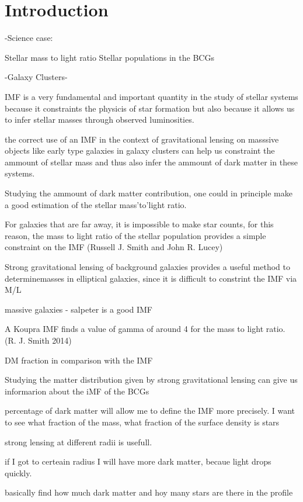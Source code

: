 \chapter{Introduction}

-Science case:

Stellar mass to light ratio
Stellar populations in the BCGs

-Galaxy Clusters-

IMF is a very fundamental and important quantity in the study of stellar systems because it constraints the physicis of star formation but also because it allows us to infer stellar masses through observed luminosities.

the correct use of an IMF in the context of gravitational lensing on masssive objects like early type galaxies in galaxy clusters can help us constraint the ammount of stellar mass and thus also infer the ammount of dark matter in these systems.

Studying the ammount of dark matter contribution, one could in principle make a good estimation of the stellar mass'to'light ratio.

For galaxies that are far away, it is impossible to make star counts, for this reason, the mass to light ratio of the stellar population provides a simple constraint on the IMF (Russell J. Smith and John R. Lucey) 

Strong gravitational lensing of background galaxies provides a useful method to determinemasses in elliptical galaxies, since it is difficult to constrint the IMF via M/L

massive galaxies - salpeter is a good IMF

A Koupra IMF finds a value of gamma of around 4 for the mass to light ratio. (R. J. Smith 2014) 

DM fraction in comparison with the IMF 

Studying the matter distribution given by strong gravitational lensing can give us informarion about the iMF of the BCGs

percentage of dark matter will allow me to define the IMF more precisely. I want to see what fraction of the mass, what fraction of the surface density is stars

strong lensing at different radii is usefull.

if I got to certeain radius I will have more dark matter, becaue light drops quickly. 

basically find how much dark matter and hoy many stars are there in the profile


\newpage
